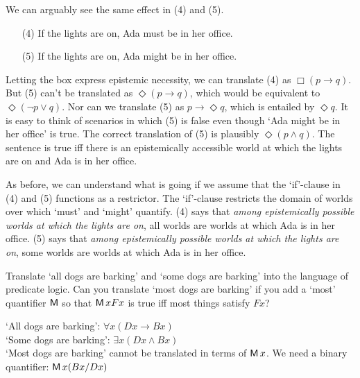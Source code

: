 We can arguably see the same effect in (4) and (5).
\begin{enumerate}[leftmargin=10mm]
  \itemsep-1mm  
  \item[(4)] If the lights are on, Ada must be in her office.
  \item[(5)] If the lights are on, Ada might be in her office.
\end{enumerate}
Letting the box express epistemic necessity, we can translate (4) as
$\Box(p \to q)$. But (5) can't be translated as $\Diamond(p \to q)$, which would
be equivalent to $\Diamond(\neg p \lor q)$. Nor can we translate (5) as
$p \to \Diamond q$, which is entailed by $\Diamond q$. It is easy to think of
scenarios in which (5) is false even though `Ada might be in her office' is
true. The correct translation of (5) is plausibly $\Diamond(p \land q)$. The
sentence is true iff there is an epistemically accessible world at which the
lights are on and Ada is in her office.

As before, we can understand what is going if we assume that the `if'-clause in
(4) and (5) functions as a restrictor. The `if'-clause restricts the domain of
worlds over which `must' and `might' quantify. (4) says that \emph{among
  epistemically possible worlds at which the lights are on}, all worlds are
worlds at which Ada is in her office. (5) says that \emph{among epistemically
  possible worlds at which the lights are on}, some worlds are worlds at which
Ada is in her office.

\begin{exercise}
  Translate `all dogs are barking' and `some dogs are barking' into the language
  of predicate logic. Can you translate `most dogs are barking' if you add a
  `most' quantifier $\operatorname{\mathsf{M}}$ so that $\operatorname{\mathsf{M}} x Fx$ is true iff most things
  satisfy $Fx$?
\end{exercise}
\begin{solution}
  `All dogs are barking': $\forall x(Dx \to Bx)$\\
  `Some dogs are barking': $\exists x(Dx \land Bx)$\\
  `Most dogs are barking' cannot be translated in terms of $\operatorname{\mathsf{M}} x$. We need
  a binary quantifier: $\operatorname{\mathsf{M}} x(Bx / Dx)$
\end{solution}

